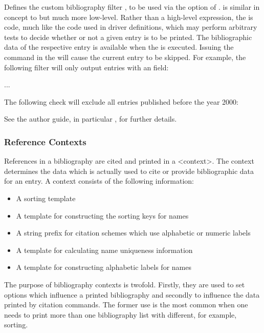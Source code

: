 \documentclass{ltxdockit}[2011/03/25]
\begin{document}
\begin{ltxsyntax}


Defines the custom bibliography filter , to be used via the  option of .  is similar in concept to  but much more low-level. Rather than a high-level expression, the  is \latex code, much like the code used in driver definitions, which may perform arbitrary tests to decide whether or not a given entry is to be printed. The bibliographic data of the respective entry is available when the  is executed. Issuing the command  in the  will cause the current entry to be skipped. For example, the following filter will only output entries with an  field:

\begin{ltxexample}
...
\printbibliography[<<check=abstract>>]
\end{ltxexample}
%
The following check will exclude all entries published before the year 2000:

\begin{ltxexample}
\end{ltxexample}
%
See the author guide, in particular , for further details.

\end{ltxsyntax}

\subsubsection{Reference Contexts}
\label{use:bib:context}

References in a bibliography are cited and printed in a <context>. The context determines the data which is actually used to cite or provide bibliographic data for an entry. A context consists of the following information:

\begin{itemize}
 \item A sorting template
 \item A template for constructing the sorting keys for names
 \item A string prefix for citation schemes which use alphabetic or numeric labels
 \item A template for calculating name uniqueness information
 \item A template for constructing alphabetic labels for names
\end{itemize}
%
The purpose of bibliography contexts is twofold. Firstly, they are used to set options which influence a printed bibliography and secondly to influence the data printed by citation commands.
The former use is the most common when one needs to print more than one bibliography list with different, for example, sorting.
\end{document}

